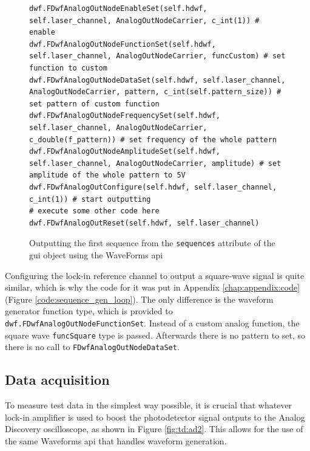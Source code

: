 \begin{figure}[ht]
	\begin{lstlisting}[language=pythe]		
dwf.FDwfAnalogOutNodeEnableSet(self.hdwf, self.laser_channel, AnalogOutNodeCarrier, c_int(1)) # enable
dwf.FDwfAnalogOutNodeFunctionSet(self.hdwf, self.laser_channel, AnalogOutNodeCarrier, funcCustom) # set function to custom
dwf.FDwfAnalogOutNodeDataSet(self.hdwf, self.laser_channel, AnalogOutNodeCarrier, pattern, c_int(self.pattern_size)) # set pattern of custom function
dwf.FDwfAnalogOutNodeFrequencySet(self.hdwf, self.laser_channel, AnalogOutNodeCarrier, c_double(f_pattern)) # set frequency of the whole pattern
dwf.FDwfAnalogOutNodeAmplitudeSet(self.hdwf, self.laser_channel, AnalogOutNodeCarrier, amplitude) # set amplitude of the whole pattern to 5V
dwf.FDwfAnalogOutConfigure(self.hdwf, self.laser_channel, c_int(1)) # start outputting
# execute some other code here
dwf.FDwfAnalogOutReset(self.hdwf, self.laser_channel)
	\end{lstlisting}
	\caption{Outputting the first sequence from the \lstinline|sequences| attribute of the \gls{gui} object using the WaveForms \gls{api}}
	\label{fig:td:pulsing_sequence}
\end{figure}

Configuring the lock-in reference channel to output a square-wave signal is quite similar, which is why the code for it was put in Appendix \ref{chap:appendix:code} (Figure \ref{code:sequence_gen_loop}). The only difference is the waveform generator function type, which is provided to \lstinline|dwf.FDwfAnalogOutNodeFunctionSet|. Instead of a custom analog function, the square wave \lstinline|funcSquare| type is passed. Afterwards there is no pattern to set, so there is no call to \lstinline|FDwfAnalogOutNodeDataSet|.

\subsection{Data acquisition} \label{chap:td:daq}
To measure test data in the simplest way possible, it is crucial that whatever lock-in amplifier is used to boost the photodetector signal outputs to the Analog Discovery oscilloscope, as shown in Figure \ref{fig:td:ad2}. This allows for the use of the same Waveforms \gls{api} that handles waveform generation.

